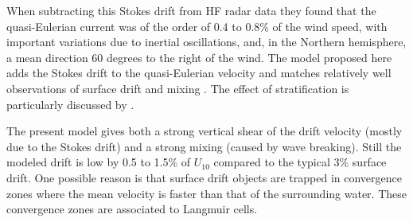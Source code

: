 When subtracting this Stokes drift from HF radar data they found that the quasi-Eulerian current was of the order of 0.4 to 0.8\% of the wind speed, with important variations due to inertial oscillations, and, in the Northern hemisphere, a mean direction 60 degrees to the right of the wind. The model proposed here adds the Stokes drift to the quasi-Eulerian velocity and matches relatively well observations of surface drift and mixing  \citep{Rascle&al.2006}. The effect of stratification is particularly discussed by \cite{Rascle&Ardhuin2009}. 

The present model gives both a strong vertical shear of the drift velocity (mostly due to the Stokes drift) and a strong mixing (caused by wave breaking). 
Still the modeled drift is low by  0.5 to 1.5\% of $U_{10}$ compared to the typical 3\% surface drift. One possible reason is that surface drift objects are trapped in convergence zones where the mean velocity is faster than that of the surrounding water. These convergence zones are associated to Langmuir cells. 

